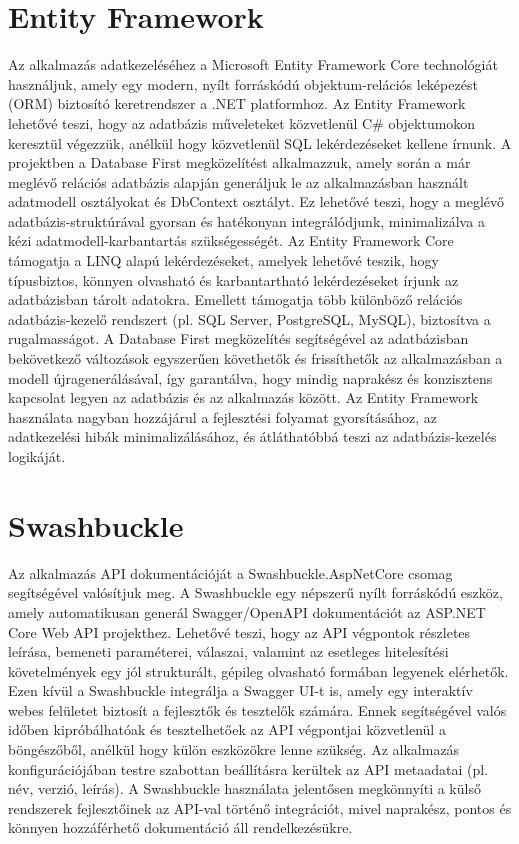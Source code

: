 \documentclass[colorlinks]{thesis-kando}
\theoremstyle{definition}
\theoremstyle{remark}
\begin{document}
\section{Entity Framework}
Az alkalmazás adatkezeléséhez a Microsoft Entity Framework Core technológiát használjuk, amely egy modern, nyílt forráskódú objektum-relációs leképezést (ORM) biztosító keretrendszer a .NET platformhoz. Az Entity Framework lehetővé teszi, hogy az adatbázis műveleteket közvetlenül C\# objektumokon keresztül végezzük, anélkül hogy közvetlenül SQL lekérdezéseket kellene írnunk.
\newline
A projektben a Database First megközelítést alkalmazzuk, amely során a már meglévő relációs adatbázis alapján generáljuk le az alkalmazásban használt adatmodell osztályokat és DbContext osztályt. Ez lehetővé teszi, hogy a meglévő adatbázis-struktúrával gyorsan és hatékonyan integrálódjunk, minimalizálva a kézi adatmodell-karbantartás szükségességét.
\newline
Az Entity Framework Core támogatja a LINQ alapú lekérdezéseket, amelyek lehetővé teszik, hogy típusbiztos, könnyen olvasható és karbantartható lekérdezéseket írjunk az adatbázisban tárolt adatokra. Emellett támogatja több különböző relációs adatbázis-kezelő rendszert (pl. SQL Server, PostgreSQL, MySQL), biztosítva a rugalmasságot.
\newline
A Database First megközelítés segítségével az adatbázisban bekövetkező változások egyszerűen követhetők és frissíthetők az alkalmazásban a modell újragenerálásával, így garantálva, hogy mindig naprakész és konzisztens kapcsolat legyen az adatbázis és az alkalmazás között.
\newline
Az Entity Framework használata nagyban hozzájárul a fejlesztési folyamat gyorsításához, az adatkezelési hibák minimalizálásához, és átláthatóbbá teszi az adatbázis-kezelés logikáját.

\section{Swashbuckle}
Az alkalmazás API dokumentációját a Swashbuckle.AspNetCore csomag segítségével valósítjuk meg. A Swashbuckle egy népszerű nyílt forráskódú eszköz, amely automatikusan generál Swagger/OpenAPI dokumentációt az ASP.NET Core Web API projekthez. Lehetővé teszi, hogy az API végpontok részletes leírása, bemeneti paraméterei, válaszai, valamint az esetleges hitelesítési követelmények egy jól strukturált, gépileg olvasható formában legyenek elérhetők.
\newline
Ezen kívül a Swashbuckle integrálja a Swagger UI-t is, amely egy interaktív webes felületet biztosít a fejlesztők és tesztelők számára. Ennek segítségével valós időben kipróbálhatóak és tesztelhetőek az API végpontjai közvetlenül a böngészőből, anélkül hogy külön eszközökre lenne szükség.
\newline
Az alkalmazás konfigurációjában testre szabottan beállításra kerültek az API metaadatai (pl. név, verzió, leírás). 
\newline
A Swashbuckle használata jelentősen megkönnyíti a külső rendszerek fejlesztőinek az API-val történő integrációt, mivel naprakész, pontos és könnyen hozzáférhető dokumentáció áll rendelkezésükre.
\end{document}
